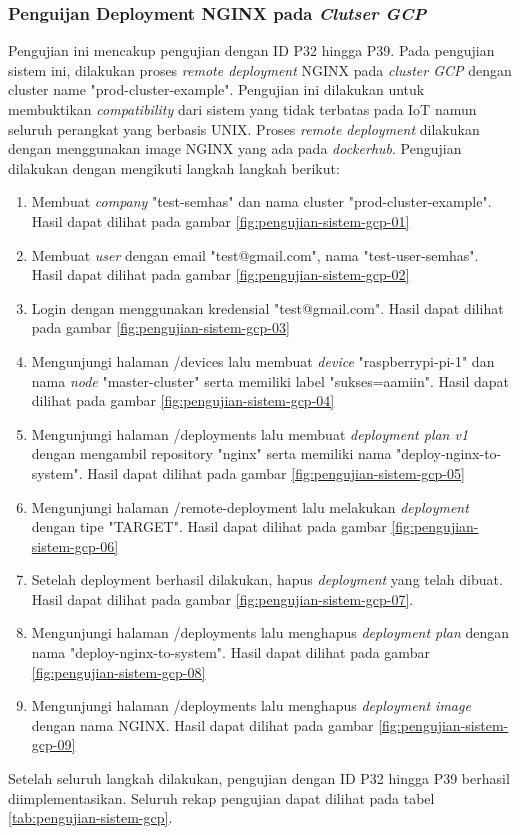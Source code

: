 \subsubsection{Penguijan Deployment NGINX pada \textit{Clutser GCP}}

Pengujian ini mencakup pengujian dengan ID P32 hingga P39. Pada pengujian sistem ini, dilakukan proses \textit{remote deployment} NGINX pada \textit{cluster GCP} dengan cluster name "prod-cluster-example". Pengujian ini dilakukan untuk membuktikan \textit{compatibility} dari sistem yang tidak terbatas pada IoT namun seluruh perangkat yang berbasis UNIX. Proses \textit{remote deployment} dilakukan dengan menggunakan image NGINX yang ada pada \textit{dockerhub}. Pengujian dilakukan dengan mengikuti langkah langkah berikut:

\begin{enumerate}
  \item Membuat \textit{company} "test-semhas" dan nama cluster "prod-cluster-example". Hasil dapat dilihat pada gambar \ref{fig:pengujian-sistem-gcp-01}
  \item Membuat \textit{user} dengan email "test@gmail.com", nama "test-user-semhas". Hasil dapat dilihat pada gambar \ref{fig:pengujian-sistem-gcp-02}
  \item Login dengan menggunakan kredensial "test@gmail.com". Hasil dapat dilihat pada gambar \ref{fig:pengujian-sistem-gcp-03}
  \item Mengunjungi halaman /devices lalu membuat \textit{device} "raspberrypi-pi-1" dan nama \textit{node} "master-cluster" serta memiliki label "sukses=aamiin". Hasil dapat dilihat pada gambar \ref{fig:pengujian-sistem-gcp-04}
  \item Mengunjungi halaman /deployments lalu membuat \textit{deployment plan v1} dengan mengambil repository "nginx" serta memiliki nama "deploy-nginx-to-system". Hasil dapat dilihat pada gambar \ref{fig:pengujian-sistem-gcp-05}
  \item Mengunjungi halaman /remote-deployment lalu melakukan \textit{deployment} dengan tipe "TARGET". Hasil dapat dilihat pada gambar \ref{fig:pengujian-sistem-gcp-06}
  \item Setelah deployment berhasil dilakukan, hapus \textit{deployment} yang telah dibuat. Hasil dapat dilihat pada gambar \ref{fig:pengujian-sistem-gcp-07}.
  \item Mengunjungi halaman /deployments lalu menghapus \textit{deployment plan} dengan nama "deploy-nginx-to-system". Hasil dapat dilihat pada gambar \ref{fig:pengujian-sistem-gcp-08}
  \item Mengunjungi halaman /deployments lalu menghapus \textit{deployment image} dengan nama NGINX. Hasil dapat dilihat pada gambar \ref{fig:pengujian-sistem-gcp-09}
\end{enumerate}

Setelah seluruh langkah dilakukan, pengujian dengan ID P32 hingga P39 berhasil diimplementasikan. Seluruh rekap pengujian dapat dilihat pada tabel \ref{tab:pengujian-sistem-gcp}.